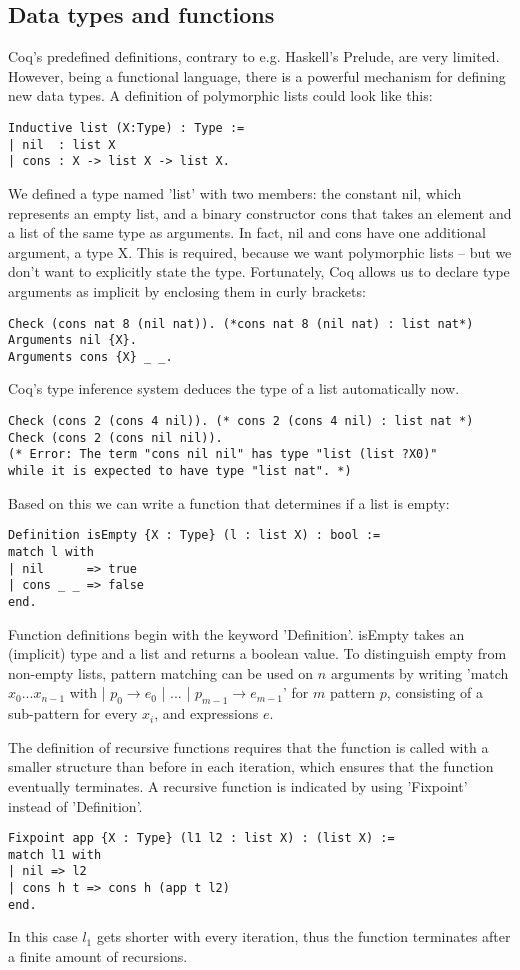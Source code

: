 \documentclass{scrreprt}
\begin{document}
\subsection{Data types and functions}
Coq's predefined definitions, contrary to e.g. Haskell's Prelude, are very limited. However, being a functional language, there is a powerful mechanism for defining new data types. A definition of polymorphic lists could look like this:
\begin{verbatim}
Inductive list (X:Type) : Type :=
| nil  : list X
| cons : X -> list X -> list X.
\end{verbatim}
We defined a type named 'list' with two members: the constant nil, which represents an empty list, and a binary constructor cons that takes an element and a list of the same type as arguments. In fact, nil and cons have one additional argument, a type X. This is required, because we want polymorphic lists -- but we don't want to explicitly state the type. Fortunately, Coq allows us to declare type arguments as implicit by enclosing them in curly brackets:
\begin{verbatim}
Check (cons nat 8 (nil nat)). (*cons nat 8 (nil nat) : list nat*)
Arguments nil {X}.
Arguments cons {X} _ _.
\end{verbatim}
Coq's type inference system deduces the type of a list automatically now.
\begin{verbatim}
Check (cons 2 (cons 4 nil)). (* cons 2 (cons 4 nil) : list nat *)
Check (cons 2 (cons nil nil)). 
(* Error: The term "cons nil nil" has type "list (list ?X0)"
while it is expected to have type "list nat". *)
\end{verbatim}
Based on this we can write a function that determines if a list is empty:
\begin{verbatim}
Definition isEmpty {X : Type} (l : list X) : bool := 
match l with
| nil      => true
| cons _ _ => false
end.
\end{verbatim}
Function definitions begin with the keyword 'Definition'. isEmpty takes an (implicit) type and a list and returns a boolean value.
To distinguish empty from non-empty lists, pattern matching can be used on $n$ arguments by writing 'match $x_{0}...x_{n-1}$ with | $p_{0} \rightarrow e_{0}$ | ... | $p_{m-1} \rightarrow e_{m-1}$' for $m$ pattern $p$, consisting of a sub-pattern for every $x_{i}$, and expressions $e$.

The definition of recursive functions requires that the function is called with a smaller structure than before in each iteration, which ensures that the function eventually terminates. A recursive function is indicated by using 'Fixpoint' instead of 'Definition'.
\begin{verbatim}
Fixpoint app {X : Type} (l1 l2 : list X) : (list X) :=
match l1 with
| nil => l2
| cons h t => cons h (app t l2)
end.
\end{verbatim}
In this case $l_{1}$ gets shorter with every iteration, thus the function terminates after a finite amount of recursions. 
\end{document}
